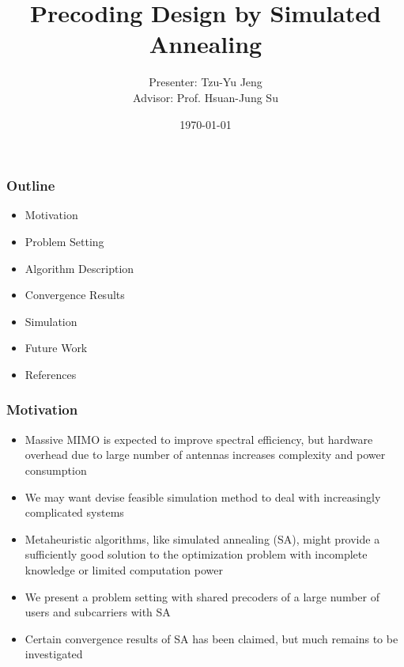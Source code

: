 \documentclass{beamer}
\author{Presenter: Tzu-Yu Jeng \\ Advisor: Prof. Hsuan-Jung Su}
\date{\today}
\title{Precoding Design by Simulated Annealing}
\begin{document}
\maketitle


\begin{frame}
	\frametitle{Outline}
	\begin{itemize}
\item Motivation
\item Problem Setting
\item Algorithm Description
\item Convergence Results
\item Simulation
\item Future Work
\item References
	\end{itemize}
\end{frame}



\begin{frame}
	\frametitle{Motivation}
	\begin{itemize}
	\item Massive MIMO is expected to improve spectral efficiency, but hardware overhead due to large number of antennas increases complexity and power consumption
	\item We may want devise feasible simulation method to deal with increasingly complicated systems
	\item Metaheuristic algorithms, like simulated annealing
(SA), might provide a sufficiently good solution to the optimization problem with incomplete knowledge or limited computation power
	\item We present a problem setting with shared precoders of a large number of users and subcarriers with SA
	\item Certain convergence results of SA has been claimed, but much remains to be investigated
	\end{itemize}
\end{frame}



\end{document}
